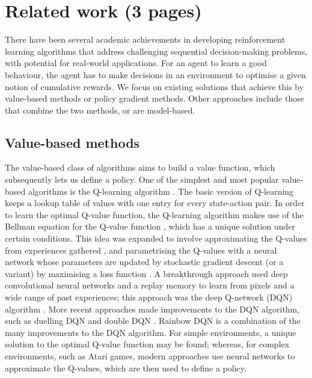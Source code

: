 \documentclass[12pt,a4paper]{article}
\begin{document}
\newpage
\section{Related work (3 pages)}
\label{section:related-work}
There have been several academic achievements in developing reinforcement learning algorithms that address challenging sequential decision-making problems, with  potential for real-world applications. For an agent to learn a good behaviour, the agent has to make decisions in an environment to optimise a given notion of cumulative rewards. We focus on existing solutions that achieve this by value-based methods or policy gradient methods. Other approaches include those that combine the two methods, or are model-based.

\subsection{Value-based methods}
The value-based class of algorithms aims to build a value function,
which subsequently lets us define a policy. One of the simplest and most popular value-based algorithms is the Q-learning algorithm \cite{Watkins1992}. The basic version of Q-learning keeps a lookup table of values with one entry for every state-action pair. In order to learn the optimal Q-value function, the Q-learning algorithm makes use of the Bellman equation for the Q-value function \cite{R-352-PR}, which has a unique solution under certain conditions. This idea was expanded to involve approximating the Q-values from experiences gathered \cite{10.5555/2998828.2998976}, and parametrising the Q-values with a neural network whose parameters are updated by stochastic gradient descent (or a variant) by maximising a loss function \cite{10.1007/11564096_32}. A breakthrough approach used deep convolutional neural networks and a replay memory to learn from pixels and a wide range of past experiences; this approach was the deep Q-network (DQN) algorithm \cite{DBLP:journals/corr/MnihKSGAWR13}. More recent approaches made improvements to the DQN algorithm, such as duelling DQN \cite{DBLP:journals/corr/WangFL15} and double DQN \cite{DBLP:journals/corr/HasseltGS15}. Rainbow DQN \cite{DBLP:journals/corr/abs-1710-02298} is a combination of the many improvements to the DQN algorithm. For simple environments, a unique solution to the optimal Q-value function may be found; whereas, for complex environments, such as Atari games, modern approaches use neural networks to approximate the Q-values, which are then used to define a policy. 
\end{document}

